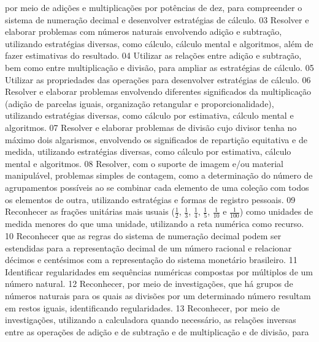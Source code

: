 {{{{{							por meio de adições e multiplicações por potências de dez, para compreender o sistema de
							numeração decimal e desenvolver estratégias de cálculo.
						}
						{03}{%
							Resolver e elaborar problemas com números naturais envolvendo adição e subtração,
							utilizando estratégias diversas, como cálculo, cálculo mental e algoritmos, além de fazer estimativas
							do resultado.
						}
						{04}{%
							Utilizar as relações entre adição e subtração, bem como entre multiplicação e divisão,
							para ampliar as estratégias de cálculo.
						}
						{05}{%
							Utilizar as propriedades das operações para desenvolver estratégias de cálculo.
						}
						{06}{%
							Resolver e elaborar problemas envolvendo diferentes significados da multiplicação
							(adição de parcelas iguais, organização retangular e proporcionalidade), utilizando estratégias
							diversas, como cálculo por estimativa, cálculo mental e algoritmos.
						}
						{07}{%
							Resolver e elaborar problemas de divisão cujo divisor tenha no máximo dois algarismos,
							envolvendo os significados de repartição equitativa e de medida, utilizando estratégias diversas,
							como cálculo por estimativa, cálculo mental e algoritmos.
						}
						{08}{%
							Resolver, com o suporte de imagem e/ou material manipulável, problemas simples
							de contagem, como a determinação do número de agrupamentos possíveis ao se combinar cada
							elemento de uma coleção com todos os elementos de outra, utilizando estratégias e formas de
							registro pessoais.
						}
						{09}{%
							Reconhecer as frações unitárias mais usuais (\(\frac{1}{2}\), \(\frac{1}{3}\), \(\frac{1}{4}\), \(\frac{1}{5}\), \(\frac{1}{10}\) e \(\frac{1}{100}\)) como
							unidades de medida menores do que uma unidade, utilizando a reta numérica como recurso.
						}
						{10}{%
							Reconhecer que as regras do sistema de numeração decimal podem ser estendidas
							para a representação decimal de um número racional e relacionar décimos e centésimos com a
							representação do sistema monetário brasileiro.
						}
						{11}{%
							Identificar regularidades em sequências numéricas compostas por múltiplos de um
							número natural.
						}
						{12}{%
							Reconhecer, por meio de investigações, que há grupos de números naturais para os
							quais as divisões por um determinado número resultam em restos iguais, identificando regularidades.
						}
						{13}{%
							Reconhecer, por meio de investigações, utilizando a calculadora quando necessário, as
							relações inversas entre as operações de adição e de subtração e de multiplicação e de divisão, para
}}}}}
